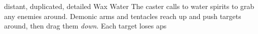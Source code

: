   {distant, duplicated, detailed}%
  {Wax}%
  {Water}%
  {}%
  {The caster calls to water spirits to grab any enemies around.
    Demonic arms and tentacles reach up and push targets around, then drag them \emph{down}.
    Each target loses  \glspl{ap}}%
  {}
